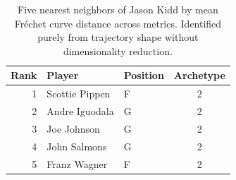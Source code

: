 \begin{table}[htbp]
  \centering\small
  \begin{tabular}{rllc}
    \toprule
    Rank & Player & Position & Archetype \\
    \midrule
    1 & Scottie Pippen & F & 2 \\
    2 & Andre Iguodala & G & 2 \\
    3 & Joe Johnson & G & 2 \\
    4 & John Salmons & G & 2 \\
    5 & Franz Wagner & F & 2 \\
    \bottomrule
  \end{tabular}
  \caption{Five nearest neighbors of Jason Kidd by mean Fr\'{e}chet curve distance across metrics. Identified purely from trajectory shape without dimensionality reduction.}
  \label{tab:Jason_Kidd_frechet_curve_neighbors}
\end{table}

